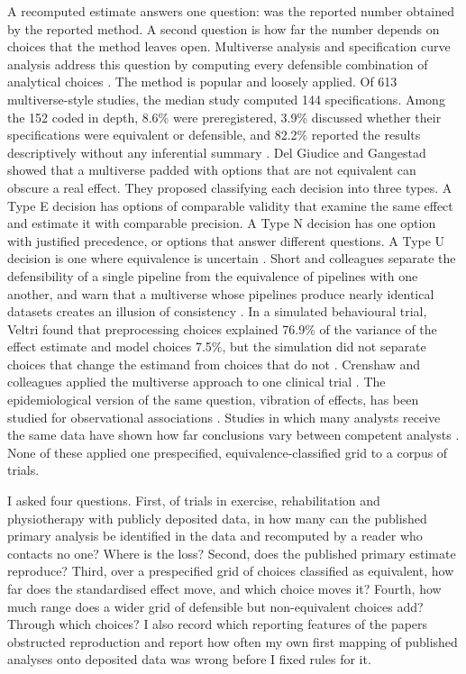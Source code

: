 A recomputed estimate answers one question: was the reported number obtained by the reported method. A second question is how far the number depends on choices that the method leaves open. Multiverse analysis and specification curve analysis address this question by computing every defensible combination of analytical choices \cite{Steegen_2016,Simonsohn_2020}. The method is popular and loosely applied. Of 613 multiverse-style studies, the median study computed 144 specifications. Among the 152 coded in depth, 8.6\% were preregistered, 3.9\% discussed whether their specifications were equivalent or defensible, and 82.2\% reported the results descriptively without any inferential summary \cite{Nepomuceno_2026}. Del Giudice and Gangestad showed that a multiverse padded with options that are not equivalent can obscure a real effect. They proposed classifying each decision into three types. A Type E decision has options of comparable validity that examine the same effect and estimate it with comparable precision. A Type N decision has one option with justified precedence, or options that answer different questions. A Type U decision is one where equivalence is uncertain \cite{Del_Giudice_2021}. Short and colleagues separate the defensibility of a single pipeline from the equivalence of pipelines with one another, and warn that a multiverse whose pipelines produce nearly identical datasets creates an illusion of consistency \cite{Short_2026}. In a simulated behavioural trial, Veltri found that preprocessing choices explained 76.9\% of the variance of the effect estimate and model choices 7.5\%, but the simulation did not separate choices that change the estimand from choices that do not \cite{Veltri_2025}. Crenshaw and colleagues applied the multiverse approach to one clinical trial \cite{Crenshaw_2026}. The epidemiological version of the same question, vibration of effects, has been studied for observational associations \cite{Patel_2015,Klau_2020}. Studies in which many analysts receive the same data have shown how far conclusions vary between competent analysts \cite{Silberzahn_2018,Botvinik_Nezer_2020,Breznau_2022,Gould_2025}. None of these applied one prespecified, equivalence-classified grid to a corpus of trials.

I asked four questions. First, of trials in exercise, rehabilitation and physiotherapy with publicly deposited data, in how many can the published primary analysis be identified in the data and recomputed by a reader who contacts no one? Where is the loss? Second, does the published primary estimate reproduce? Third, over a prespecified grid of choices classified as equivalent, how far does the standardised effect move, and which choice moves it? Fourth, how much range does a wider grid of defensible but non-equivalent choices add? Through which choices? I also record which reporting features of the papers obstructed reproduction and report how often my own first mapping of published analyses onto deposited data was wrong before I fixed rules for it.

